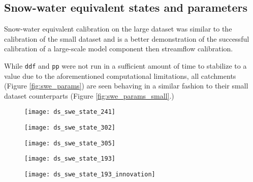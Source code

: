 \subsection{Snow-water equivalent states and parameters}

Snow-water equivalent calibration on the large dataset was similar to the calibration of the small dataset and is a better demonstration of the successful calibration of a large-scale model component then streamflow calibration.

While \texttt{ddf} and \texttt{pp} were not run in a sufficient amount of time to stabilize to a value due to the aforementioned computational limitations, all catchments (Figure \ref{fig:swe_params}) are seen behaving in a similar fashion to their small dataset counterparts (Figure \ref{fig:swe_params_small}.)

\begin{figure}
\centering
\begin{minipage}{.33\textwidth}
  \centering
  \texttt{[image: ds\_swe\_state\_241]}
  \label{fig:ds_swe_state_241}
\end{minipage}%
\begin{minipage}{.33\textwidth}
  \centering
  \texttt{[image: ds\_swe\_state\_302]}
  \label{fig:ds_swe_state_302}
\end{minipage}
\begin{minipage}{.33\textwidth}
  \centering
  \texttt{[image: ds\_swe\_state\_305]}
  \label{fig:ds_swe_state_305}
\end{minipage}
\label{fig:swe_state}
\end{figure}

\begin{figure}
\centering
\begin{minipage}{.48\textwidth}
  \centering
  \texttt{[image: ds\_swe\_state\_193]}
  \label{fig:ds_swe_state_193}
\end{minipage}%
\begin{minipage}{.48\textwidth}
  \centering
  \texttt{[image: ds\_swe\_state\_193\_innovation]}
  \label{fig:ds_swe_state_193_innovation}
\end{minipage}
\label{fig:swestate193}
\end{figure}

